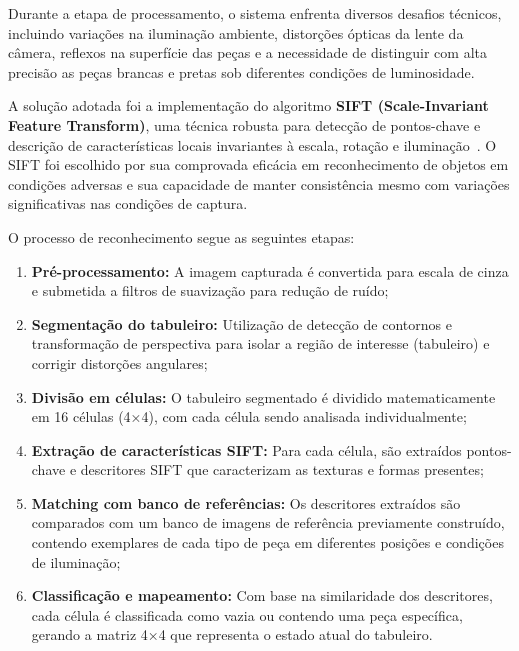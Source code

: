 \documentclass[a4paper]{ifacconf}
\begin{document}
\par\noindent Durante a etapa de processamento, o sistema enfrenta diversos desafios técnicos, incluindo variações na iluminação ambiente, distorções ópticas da lente da câmera, reflexos na superfície das peças e a necessidade de distinguir com alta precisão as peças brancas e pretas sob diferentes condições de luminosidade.

\par\noindent A solução adotada foi a implementação do algoritmo \textbf{SIFT (Scale-Invariant Feature Transform)}, uma técnica robusta para detecção de pontos-chave e descrição de características locais invariantes à escala, rotação e iluminação~\cite{lowe2004sift}. O SIFT foi escolhido por sua comprovada eficácia em reconhecimento de objetos em condições adversas e sua capacidade de manter consistência mesmo com variações significativas nas condições de captura.

\par\noindent O processo de reconhecimento segue as seguintes etapas:

\begin{enumerate}
\item \textbf{Pré-processamento:} A imagem capturada é convertida para escala de cinza e submetida a filtros de suavização para redução de ruído;
\item \textbf{Segmentação do tabuleiro:} Utilização de detecção de contornos e transformação de perspectiva para isolar a região de interesse (tabuleiro) e corrigir distorções angulares;
\item \textbf{Divisão em células:} O tabuleiro segmentado é dividido matematicamente em 16 células (4×4), com cada célula sendo analisada individualmente;
\item \textbf{Extração de características SIFT:} Para cada célula, são extraídos pontos-chave e descritores SIFT que caracterizam as texturas e formas presentes;
\item \textbf{Matching com banco de referências:} Os descritores extraídos são comparados com um banco de imagens de referência previamente construído, contendo exemplares de cada tipo de peça em diferentes posições e condições de iluminação;
\item \textbf{Classificação e mapeamento:} Com base na similaridade dos descritores, cada célula é classificada como vazia ou contendo uma peça específica, gerando a matriz 4×4 que representa o estado atual do tabuleiro.
\end{enumerate}
\end{document}
